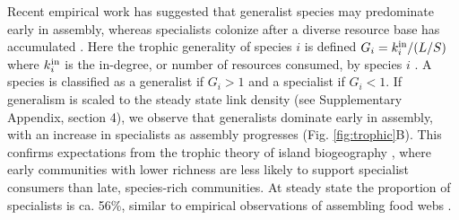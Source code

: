 \documentclass[twocolumn,preprintnumbers,amsmath,amssymb,superscriptaddress,linenumbers]{revtex4-1}
\newcommand{\rr}[1]{{\rm #1}}
\begin{document}
% 




Recent empirical work has suggested that generalist species may predominate early in assembly, whereas specialists colonize after a diverse resource base has accumulated \cite{Piechnik2008,Gravel2011}.
Here the trophic generality of species $i$ is defined $G_i = k^{\rm in}_i/(L/S)$ where $k^{\rm in}_i$ is the in-degree, or number of resources consumed, by species $i$ \cite{Williams2000}.
A species is classified as a generalist if $G_i > 1$ and a specialist if $G_i < 1$.
If generalism is scaled to the steady state link density (see Supplementary Appendix, section 4), we observe that generalists dominate early in assembly, with an increase in specialists as assembly progresses (Fig. \ref{fig:trophic}B).
This confirms expectations from the trophic theory of island biogeography \cite{Gravel2011}, where early communities with lower richness are less likely to support specialist consumers than late, species-rich communities.
At steady state the proportion of specialists is ca. 56\%, similar to empirical observations of assembling food webs \cite{Piechnik2008}.
\end{document}
